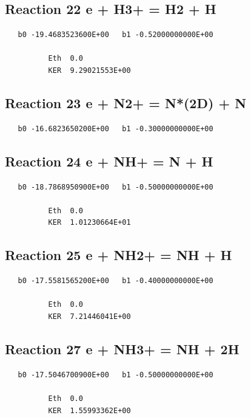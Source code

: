\documentclass[12pt]{article}
\begin{document}
\subsection{
Reaction 22 e + H3+ = H2 + H }
\begin{small}\begin{verbatim}
   b0 -19.4683523600E+00   b1 -0.52000000000E+00

          Eth  0.0
          KER  9.29021553E+00

\end{verbatim}\end{small}
\newpage

\subsection{
Reaction 23 e + N2+ = N*(2D) + N }
\begin{small}\begin{verbatim}
   b0 -16.6823650200E+00   b1 -0.30000000000E+00
\end{verbatim}\end{small}
\newpage

\subsection{
Reaction 24 e + NH+ = N + H }
\begin{small}\begin{verbatim}
   b0 -18.7868950900E+00   b1 -0.50000000000E+00

          Eth  0.0
          KER  1.01230664E+01

\end{verbatim}\end{small}
\newpage

\subsection{
Reaction 25 e + NH2+ = NH + H }
\begin{small}\begin{verbatim}
   b0 -17.5581565200E+00   b1 -0.40000000000E+00

          Eth  0.0
          KER  7.21446041E+00

\end{verbatim}\end{small}
\newpage

\subsection{
Reaction 27 e + NH3+ = NH + 2H }
\begin{small}\begin{verbatim}
   b0 -17.5046700900E+00   b1 -0.50000000000E+00

          Eth  0.0
          KER  1.55993362E+00

\end{verbatim}\end{small}
\newpage
\end{document}

